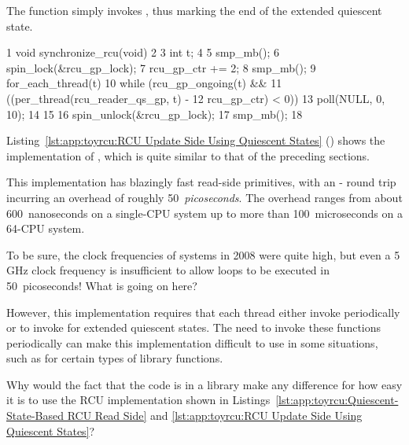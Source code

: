 The  function simply invokes
, thus marking the end of the extended
quiescent state.

\begin{listing}[tbp]
{ \scriptsize
\begin{verbbox}
  1 void synchronize_rcu(void)
  2 {
  3   int t;
  4
  5   smp_mb();
  6   spin_lock(&rcu_gp_lock);
  7   rcu_gp_ctr += 2;
  8   smp_mb();
  9   for_each_thread(t) {
 10     while (rcu_gp_ongoing(t) &&
 11            ((per_thread(rcu_reader_qs_gp, t) -
 12              rcu_gp_ctr) < 0)) {
 13       poll(NULL, 0, 10);
 14     }
 15   }
 16   spin_unlock(&rcu_gp_lock);
 17   smp_mb();
 18 }
\end{verbbox}
}
\centering
\theverbbox
\caption{RCU Update Side Using Quiescent States}
\label{lst:app:toyrcu:RCU Update Side Using Quiescent States}
\end{listing}

Listing~\ref{lst:app:toyrcu:RCU Update Side Using Quiescent States}
()
shows the implementation of , which is
quite similar to that of the preceding sections.

This implementation has blazingly fast read-side primitives, with
an - round trip incurring
an overhead of roughly 50~\emph{picoseconds}.
The  overhead ranges from about 600~nanoseconds
on a single-CPU  system up to more than 100~microseconds on
a 64-CPU system.

\QuickQuiz{}
	To be sure, the clock frequencies of \Power{}
	systems in 2008 were quite high, but even a 5\,GHz clock
	frequency is insufficient to allow
	loops to be executed in 50~picoseconds!
	What is going on here?
 \QuickQuizEnd

However, this implementation requires that each thread either
invoke  periodically or to invoke
 for extended quiescent states.
The need to invoke these functions periodically can make this
implementation difficult to use in some situations, such as for
certain types of library functions.

\QuickQuiz{}
	Why would the fact that the code is in a library make
	any difference for how easy it is to use the RCU
	implementation shown in
	Listings~\ref{lst:app:toyrcu:Quiescent-State-Based RCU Read Side} and
	\ref{lst:app:toyrcu:RCU Update Side Using Quiescent States}?
 \QuickQuizEnd

